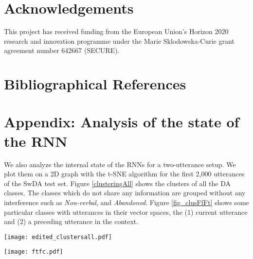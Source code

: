 \documentclass[10pt, a4paper]{article}
\begin{document}
\section{Acknowledgements}

This project has received funding from the European Union's Horizon 2020 research and innovation programme under the Marie Sklodowska-Curie grant agreement number 642667 (SECURE).


\section{Bibliographical References}
\label{main:ref}






\section*{Appendix: Analysis of the state of the RNN}

We also analyze the internal state  of the RNNs for a two-utterance setup.
We plot them on a 2D graph with the t-SNE algorithm for the first 2,000 utterances of the SwDA test set.
Figure \ref{clusteringAll} shows the clusters of all the DA classes. 
The classes which do not share any information are grouped without any interference such as \textit{Non-verbal}, and \textit{Abandoned}.
Figure \ref{fig_clusFfFt} shows some particular classes with utterances in their vector spaces, the (1) current utterance and (2) a preceding utterance in the context.


\begin{figure*}[b]
\begin{center}
\texttt{[image: edited\_clustersall.pdf]} 
\caption{Clusters of all classes. Big clusters belong to the dominating \textit{Statement} classes, \textit{sv} and \textit{sd}.
The \textit{Question} classes, \textit{qy}, \textit{qw}, \textit{qh} and \textit{qo} are clustered within the big class. 
The classes \textit{Backchannel}, \textit{Yes-answers}, and \textit{Agree/Accept} share a lot of syntactic information hence they are clustered together, and our approach makes those classes separable within the cluster.}
\label{clusteringAll}
\end{center}
\end{figure*}






\begin{figure*}[b]
\begin{center}
\texttt{[image: ftfc.pdf]} 
\caption{A blowup of the rectangle in Figure \ref{clusteringAll} from the \textit{Conventional closing (fc)} and \textit{thanking (ft) function} classes with their utterances. 
For readability, some utterances have been omitted and we show only the labels.
These are examples of the context-sensitive dialogues, where we can see one cluster of the \textit{ft} class and three groups of the \textit{fc} class. 
}
\label{fig_clusFfFt}
\end{center}
\end{figure*}
\end{document}
